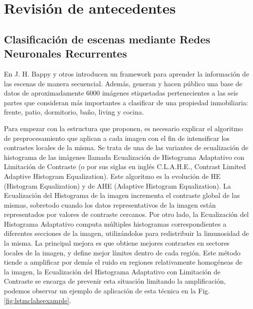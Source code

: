 \section{Revisión de antecedentes}
\subsection{Clasificación de escenas mediante Redes Neuronales Recurrentes}
En \cite{lstm_real_estate} J. H. Bappy y otros introducen un framework para aprender la información de las escenas de manera secuencial. Además, generan y hacen público una base de datos de aproximadamente 6000 imágenes etiquetadas pertenecientes a las seis partes que consideran más importantes a clasificar de una propiedad inmobiliaria: frente, patio, dormitorio, baño, living y cocina.

Para empezar con la estructura que proponen, es necesario explicar el algoritmo de preprocesamiento que aplican a cada imagen con el fin de intensificar los contrastes locales de la misma. Se trata de una de las variantes de ecualización de histograma de las imágenes llamada Ecualización de Histograma Adaptativo con Limitación de Contraste (o por sus siglas en inglés C.L.A.H.E., Contrast Limited Adaptive Histogram Equalization). Este algoritmo es la evolución de HE (Histogram Equalization) y de AHE (Adaptive Histogram Equalization). 
La Ecualización del Histograma de la imagen incrementa el contraste global de las mismas, sobretodo cuando los datos representativos de la imagen están representados por valores de contraste cercanos.
Por otro lado, la Ecualización del Histograma Adaptativo computa múltiples histogramas correspondientes a diferentes secciones de la imagen, utilizándolos para redistribuir la limunosidad de la misma. La principal mejora es que obtiene mejores contrastes en sectores locales de la imagen, y define mejor límites dentro de cada región.
Este método tiende a amplificar por demás el ruido en regiones relativamente homogéneas de la imagen, la Ecualización del Histograma Adaptativo con Limitación de Contraste se encarga de prevenir esta situación limitando la amplificación, podemos observar un ejemplo de aplicación de esta técnica en la Fig. \ref{fig:lstmclaheexample}.
